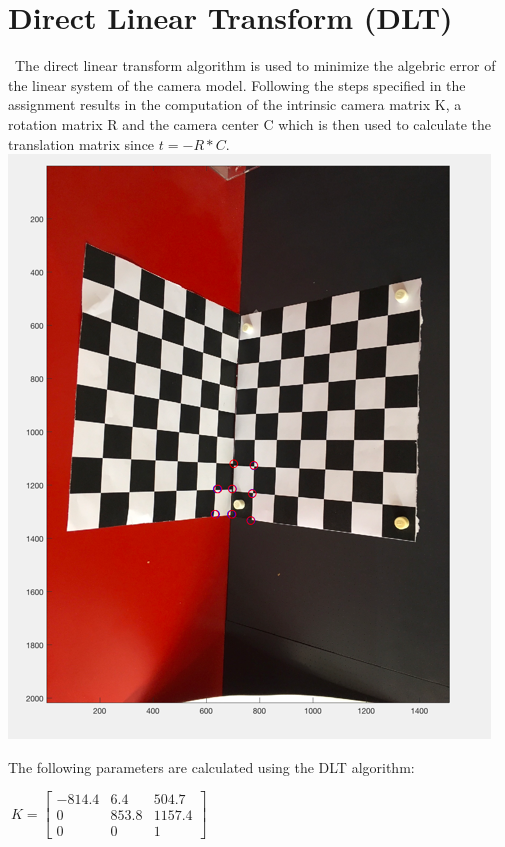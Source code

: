 \documentclass[]{article}
\begin{document}
\section{Direct Linear Transform (DLT)}\
The direct linear transform algorithm is used to minimize the algebric error of the linear system of the camera model. Following the steps specified in the assignment results in the computation of the intrinsic camera matrix K, a rotation matrix R and the camera center C which is then used to calculate the translation matrix since $t = -R*C$. \newline
\includegraphics{dlt.png}

The following parameters are calculated using the DLT algorithm:

\medskip
$\
K =
\begin{bmatrix}
-814.4       & 6.4  & 504.7\\
0     & 853.8 & 1157.4 \\
0     & 0 &  1
\end{bmatrix}$
\end{document}
